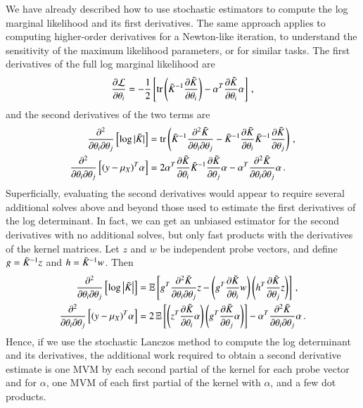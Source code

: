 We have already described how to use stochastic estimators to compute the log
marginal likelihood and its first derivatives. The same approach applies to
computing higher\hyp{}order derivatives for a Newton\hyp{}like iteration, to
understand the sensitivity of the maximum likelihood parameters, or for similar
tasks. The first derivatives of the full log marginal likelihood are
\begin{equation}\label{eqn:loglikderiv}
  \frac{\partial \mathcal{L}}{\partial \theta_i} = -\frac{1}{2} \left[\operatorname{tr}\left(\tilde{K}_{}^{-1} \frac{\partial \tilde{K}_{}}{\partial \theta_i}\right) - \alpha^T 
  \frac{\partial \tilde{K}_{}}{\partial \theta_i} \alpha\right]\,,
\end{equation}
and the second derivatives of the two terms are
\begin{align}
  \frac{\partial^2}{\partial \theta_i \partial \theta_j} \left[ \log |\tilde K|
  \right] &= \operatorname{tr}\left(\tilde{K}_{}^{-1} \frac{\partial^2 \tilde{K}_{}} {\partial \theta_i
  \partial \theta_j} - \tilde{K}_{}^{-1} \frac{\partial \tilde{K}_{}}{\partial \theta_i}
  \tilde{K}_{}^{-1} \frac{\partial \tilde{K}_{}}{\partial \theta_j}\right)\,, \\
  \frac{\partial^2}{\partial \theta_i \partial \theta_j} \left[ (y-\mu_X)^T
  \alpha \right] &= 2\alpha^T \frac{\partial \tilde{K}_{}}{\partial \theta_i}
  \tilde{K}_{}^{-1}\frac{\partial \tilde K}{\partial \theta_j} \alpha - \alpha^T 
  \frac{\partial^2 \tilde{K}_{}} {\partial \theta_i \partial \theta_j}\alpha\,.
\end{align}
Superficially, evaluating the second derivatives would appear to require several
additional solves above and beyond those used to estimate the first derivatives
of the log determinant.  In fact, we can get an unbiased estimator for the
second derivatives with no additional solves, but only fast products with the
derivatives of the kernel matrices.  Let $z$ and $w$ be independent probe
vectors, and define $g = \tilde{K}_{}^{-1}z$ and $h = \tilde{K}_{}^{-1}w$.  Then
\begin{align}
  \frac{\partial^2}{\partial \theta_i \partial \theta_j} \left[\log\left\lvert\tilde{K}_{}\right\rvert
  \right] &= \operatorname{\mathbb{E}} \left[ g^T \frac{\partial^2 \tilde{K}_{}} {\partial \theta_i
  \partial \theta_j} z - \left( g^T \frac{\partial \tilde{K}_{}}{\partial \theta_i}
  w \right) \left( h^T \frac{\partial \tilde{K}_{}}{\partial \theta_j} z \right)
  \right]\,, \\
  \frac{\partial^2}{\partial \theta_i \partial \theta_j} \left[ (y-\mu_X)^T
  \alpha \right] &= 2 \operatorname{\mathbb{E}} \left[\left( z^T \frac{\partial \tilde{K}_{}}{\partial
  \theta_i} \alpha \right) \left( g^T \frac{\partial \tilde{K}_{}}{\partial \theta_j}
  \alpha \right)\right] - \alpha^T \frac{\partial^2 \tilde{K}_{}} {\partial \theta_i
  \partial \theta_j}\alpha\,.
\end{align}
Hence, if we use the stochastic Lanczos method to compute the log determinant
and its derivatives, the additional work required to obtain a second derivative
estimate is one MVM by each second partial of the kernel for each probe vector
and for $\alpha$, one MVM of each first partial of the kernel with $\alpha$, and
a few dot products.


